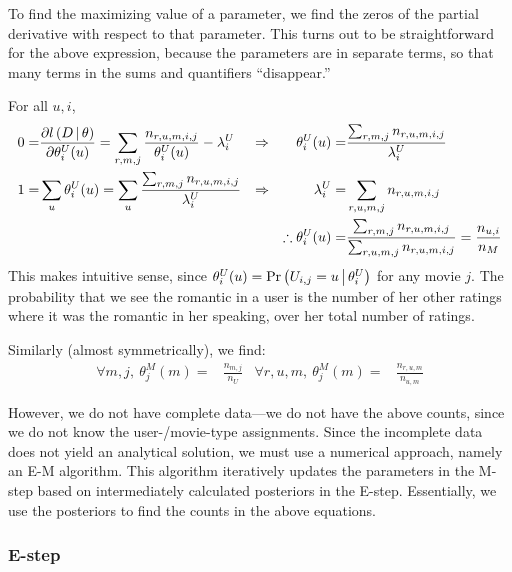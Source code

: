 \documentclass{article}
\begin{document}
To find the maximizing value of a parameter, we find the zeros of the
partial derivative with respect to that parameter. This turns out to
be straightforward for the above expression, because the parameters
are in separate terms, so that many terms in the sums and quantifiers
``disappear.''

For all $u,i$,
\begin{align}
  0 =& \frac{ \partial {\ensuremath{ l \left( D \,\middle|\, \theta \right) }} }{ \partial \theta^U_i(u) }
  = \sum_{r,m,j} \frac{ n_{r,u,m,i,j} }{ \theta^U_i(u) } - \lambda^U_i
  & \Rightarrow &&
  \theta^U_i(u) =& \frac{ \sum_{r,m,j} n_{r,u,m,i,j} }{ \lambda^U_i } \\
  1 =& \sum_u \theta^U_i(u) 
  = \sum_u \frac{ \sum_{r,m,j} n_{r,u,m,i,j} }{ \lambda^U_i }
  & \Rightarrow &&
  \lambda^U_i =& \sum_{r,u,m,j} n_{r,u,m,i,j} \\
  &&&& \therefore \theta^U_i(u) 
  =& \frac{ \sum_{r,m,j} n_{r,u,m,i,j} }{ \sum_{r,u,m,j} n_{r,u,m,i,j} }
  = \frac{ n_{u,i} }{ n_M } \label{eq:pui}
\end{align}
This makes intuitive sense, since $\theta^U_i(u) = {{\Pr \left(  U_{i,j} =
u \,\middle|\, \theta^U_i  \right)}}$ for any movie $j$. The probability that we see the
romantic in a user is the number of her other ratings where it was the
romantic in her speaking, over her total number of ratings.

Similarly (almost symmetrically), we find:
\begin{align}
\forall m,j,\ \theta^M_j(m) =& \frac{ n_{m,j} }{ n_U }
&
\forall r,u,m,\ \theta^M_j(m) =& \frac{ n_{r,u,m} }{ n_{u,m} }
\label{eq:prum}
\end{align}

However, we do not have complete data---we do not have the above
counts, since we do not know the user-/movie-type assignments. Since
the incomplete data does not yield an analytical solution, we must use
a numerical approach, namely an E-M algorithm. This algorithm
iteratively updates the parameters in the M-step based on
intermediately calculated posteriors in the E-step. Essentially, we
use the posteriors to find the  counts in the above
equations.

\subsubsection{E-step}
\end{document}
